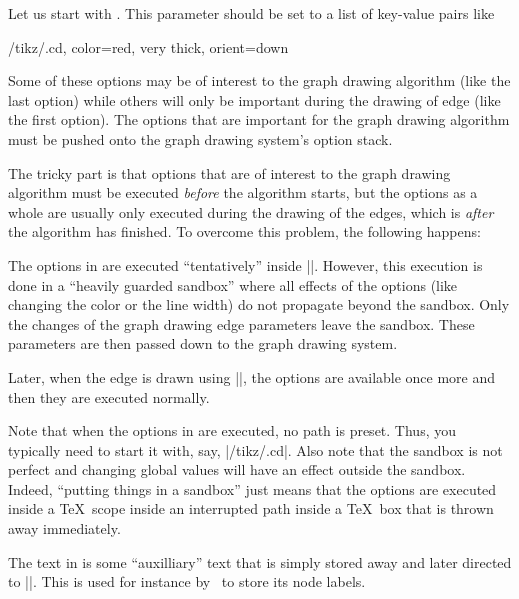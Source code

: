 \begin{command}{\pgfgdedge{}}
  Let us start with . This parameter should be set
  to a list of key-value pairs like
\begin{codeexample}
/tikz/.cd, color=red, very thick, orient=down
\end{codeexample}
  Some of these options may be of interest to the graph drawing
  algorithm (like the last option) while others will 
  only be important during the drawing of edge (like the first
  option). The options that are important for the graph drawing
  algorithm must be pushed onto the graph drawing system's option
  stack. 

  The tricky part is that options that are of interest to the graph
  drawing algorithm must be executed \emph{before} the algorithm starts,
  but the options as a whole are usually only executed during the
  drawing of the edges, which is \emph{after} the algorithm has finished.
  To overcome this problem, the following happens:

  The options in  are executed ``tentatively'' inside
  |\pgfgdedge|. However, this execution is done in a ``heavily guarded
  sandbox'' where all effects of the options (like changing the
  color or the line width) do not propagate beyond the sandbox. Only
  the changes of the graph drawing edge parameters leave the
  sandbox. These parameters are then passed down to the graph drawing
  system.

  Later, when the edge is drawn using |\pgfgdedgecallback|, the
  options  are available once more and then they
  are executed normally.

  Note that when the options in  are executed, no
  path is preset. Thus, you typically need to start it with, say,
  |/tikz/.cd|. Also note that the sandbox is not perfect and changing
  global values will have an effect outside the sandbox. Indeed,
  ``putting things in a sandbox'' just means that the options are
  executed inside a \TeX\ scope inside an interrupted path inside a
  \TeX\ box that is thrown away immediately. 
  
  The text in  is some ``auxilliary'' text that is
  simply stored away and later directed to |\pgfgdedgecallback|. This
  is used for instance by \tikzname\ to store its node labels. 
\end{command}


